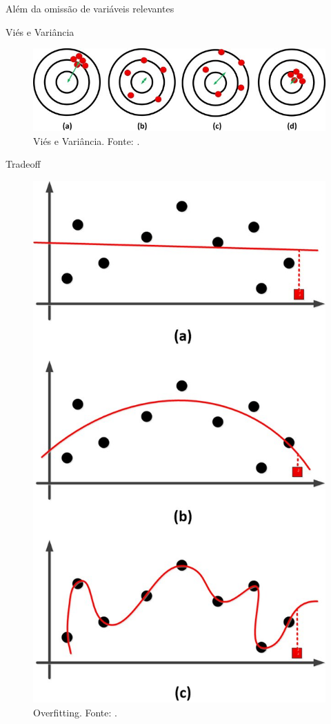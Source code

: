 \documentclass[9pt,ignorenonframetext,aspectratio=169]{beamer}
\begin{document}
\begin{frame}{Além da omissão de variáveis relevantes}
\protect\hypertarget{aluxe9m-da-omissuxe3o-de-variuxe1veis-relevantes}{}

\begin{block}{Viés e Variância}

\begin{figure}

{\centering \includegraphics[width=0.7\linewidth]{../../images/The-dart-example} 

}

\caption{Viés e Variância. Fonte: \textcite{ghojogh2019theory}.}\label{fig:unnamed-chunk-2}
\end{figure}

\end{block}

\end{frame}

\begin{frame}{Tradeoff}
\protect\hypertarget{tradeoff}{}

\begin{figure}

{\centering \includegraphics[width=0.25\linewidth]{../../images/An-example-for-a-underfitting-b-good-fit-and-c-overfitting-The-black-circles-and_W640} 

}

\caption{Overfitting. Fonte: \textcite{ghojogh2019theory}.}\label{fig:unnamed-chunk-3}
\end{figure}

\end{frame}
\end{document}
